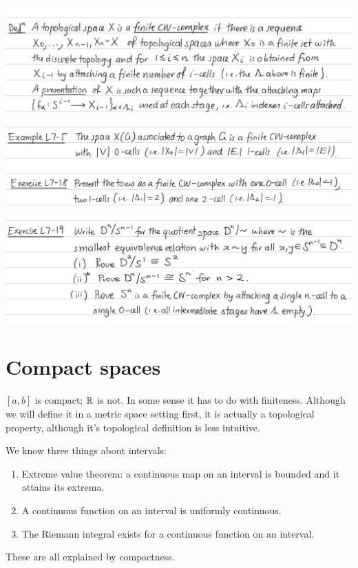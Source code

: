 \begin{definition}
  \begin{mdframed}
\includegraphics[width=400pt]{img/analysis--berkeley-202a-topology-ec33.png}
\end{mdframed}
\end{definition}

\section{Compact spaces}

$[a, b]$ is compact; $\mathbb{R}$ is not. In some sense it has to do with finiteness. Although we will
define it in a metric space setting first, it is actually a topological property, although it's
topological definition is less intuitive.

We know three things about intervals:
\begin{enumerate}
\item Extreme value theorem: a continuous map on an interval is bounded and it attains its extrema.
\item A continuous function on an interval is uniformly continuous.
\item The Riemann integral exists for a continuous function on an interval.
\end{enumerate}

These are all explained by compactness.

